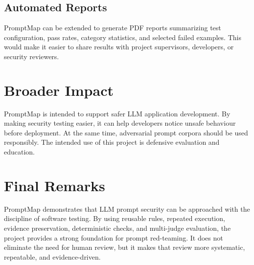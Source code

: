 \subsection{Automated Reports}
PromptMap can be extended to generate PDF reports summarizing test configuration, pass rates, category statistics, and selected failed examples. This would make it easier to share results with project supervisors, developers, or security reviewers.

\section{Broader Impact}
PromptMap is intended to support safer LLM application development. By making security testing easier, it can help developers notice unsafe behaviour before deployment. At the same time, adversarial prompt corpora should be used responsibly. The intended use of this project is defensive evaluation and education.

\section{Final Remarks}
PromptMap demonstrates that LLM prompt security can be approached with the discipline of software testing. By using reusable rules, repeated execution, evidence preservation, deterministic checks, and multi-judge evaluation, the project provides a strong foundation for prompt red-teaming. It does not eliminate the need for human review, but it makes that review more systematic, repeatable, and evidence-driven.
